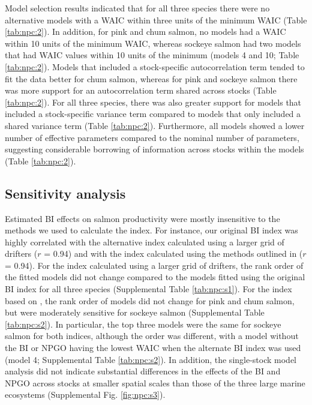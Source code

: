 Model selection results indicated that for all three species there were no
alternative models with a WAIC within three units of the minimum WAIC (Table
\ref{tab:npc:2}). In addition, for pink and chum salmon, no models had a WAIC
within 10 units of the minimum WAIC, whereas sockeye salmon had two models that
had WAIC values within 10 units of the minimum (models 4 and 10; Table
\ref{tab:npc:2}). Models that included a stock-specific autocorrelation term
tended to fit the data better for chum salmon, whereas for pink and sockeye
salmon there was more support for an autocorrelation term shared across stocks
(Table \ref{tab:npc:2}). For all three species, there was also greater support
for models that included a stock-specific variance term compared to models that
only included a shared variance term (Table \ref{tab:npc:2}). Furthermore, all
models showed a lower number of effective parameters compared to the nominal
number of parameters, suggesting considerable borrowing of information across
stocks within the models (Table \ref{tab:npc:2}).


\subsection{Sensitivity analysis}

Estimated BI effects on salmon productivity were mostly insensitive to the
methods we used to calculate the index. For instance, our original BI index was
highly correlated with the alternative index calculated using a larger grid of
drifters (\(r\) = 0.94) and with the index calculated using the methods outlined
in \citet{Watters2008a} (\(r\) = 0.94). For the index calculated using a larger
grid of drifters, the rank order of the fitted models did not change compared to
the models fitted using the original BI index for all three species
(Supplemental Table \ref{tab:npc:s1}). For the index based on
\citet{Watters2008a}, the rank order of models did not change for pink and chum
salmon, but were moderately sensitive for sockeye salmon (Supplemental Table
\ref{tab:npc:s2}). In particular, the top three models were the same for sockeye
salmon for both indices, although the order was different, with a model without
the BI or NPGO having the lowest WAIC when the alternate \citet{Watters2008a} BI
index was used (model 4; Supplemental Table \ref{tab:npc:s2}). In addition, the
single-stock model analysis did not indicate substantial differences in the
effects of the BI and NPGO across stocks at smaller spatial scales than those of
the three large marine ecosystems (Supplemental Fig. \ref{fig:npc:s3}).


